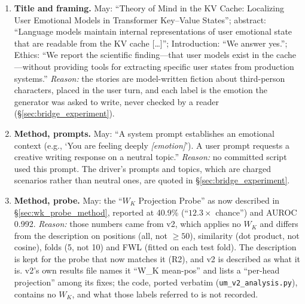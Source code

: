 \documentclass[11pt,a4paper]{article}
\begin{document}
\begin{enumerate}[leftmargin=*]
    \item \textbf{Title and framing.} May: ``Theory of Mind in the KV Cache: Localizing User Emotional Models in Transformer Key--Value States''; abstract: ``Language models maintain internal representations of user emotional state that are readable from the KV cache [\ldots]''; Introduction: ``We answer yes.''; Ethics: ``We report the scientific finding---that user models exist in the cache---without providing tools for extracting specific user states from production systems.'' \emph{Reason:} the stories are model-written fiction about third-person characters, placed in the user turn, and each label is the emotion the generator was asked to write, never checked by a reader (\S\ref{sec:bridge_experiment}).

    \item \label{app:item:prompts}\textbf{Method, prompts.} May: ``A system prompt establishes an emotional context (e.g., `You are feeling deeply \textit{[emotion]}'). A user prompt requests a creative writing response on a neutral topic.'' \emph{Reason:} no committed script used this prompt. The driver's prompts and topics, which are charged scenarios rather than neutral ones, are quoted in \S\ref{sec:bridge_experiment}.

    \item \label{app:item:probe}\textbf{Method, probe.} May: the ``$W_K$ Projection Probe'' as now described in \S\ref{sec:wk_probe_method}, reported at 40.9\% (``$12.3\times$ chance'') and AUROC 0.992. \emph{Reason:} those numbers came from v2, which applies no $W_K$ and differs from the description on positions (all, not $\geq 50$), similarity (dot product, not cosine), folds (5, not 10) and FWL (fitted on each test fold). The description is kept for the probe that now matches it (R2), and v2 is described as what it is. v2's own results file names it ``W\_K mean-pos'' and lists a ``per-head projection'' among its fixes; the code, ported verbatim (\texttt{um\_v2\_analysis.py}), contains no $W_K$, and what those labels referred to is not recorded.


\end{enumerate}
\end{document}
